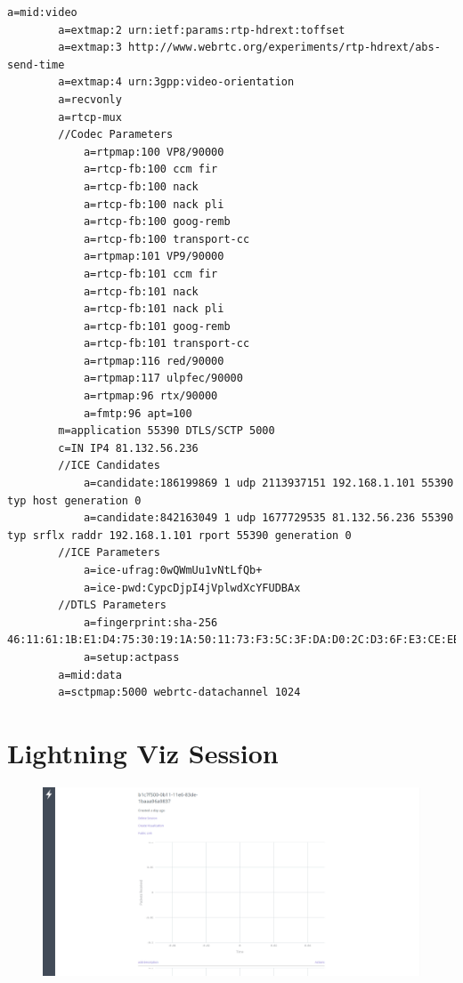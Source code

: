 \documentclass[]{report}
\begin{document}
\begin{lstlisting}[tabsize=1,frame=single, basicstyle=\ttfamily\footnotesize, breaklines=true]
		a=mid:video
		a=extmap:2 urn:ietf:params:rtp-hdrext:toffset
		a=extmap:3 http://www.webrtc.org/experiments/rtp-hdrext/abs-send-time
		a=extmap:4 urn:3gpp:video-orientation
		a=recvonly
		a=rtcp-mux
		//Codec Parameters
			a=rtpmap:100 VP8/90000
			a=rtcp-fb:100 ccm fir
			a=rtcp-fb:100 nack
			a=rtcp-fb:100 nack pli
			a=rtcp-fb:100 goog-remb
			a=rtcp-fb:100 transport-cc
			a=rtpmap:101 VP9/90000
			a=rtcp-fb:101 ccm fir
			a=rtcp-fb:101 nack
			a=rtcp-fb:101 nack pli
			a=rtcp-fb:101 goog-remb
			a=rtcp-fb:101 transport-cc
			a=rtpmap:116 red/90000
			a=rtpmap:117 ulpfec/90000
			a=rtpmap:96 rtx/90000
			a=fmtp:96 apt=100
		m=application 55390 DTLS/SCTP 5000
		c=IN IP4 81.132.56.236
		//ICE Candidates
			a=candidate:186199869 1 udp 2113937151 192.168.1.101 55390 typ host generation 0
			a=candidate:842163049 1 udp 1677729535 81.132.56.236 55390 typ srflx raddr 192.168.1.101 rport 55390 generation 0
		//ICE Parameters
			a=ice-ufrag:0wQWmUu1vNtLfQb+
			a=ice-pwd:CypcDjpI4jVplwdXcYFUDBAx
		//DTLS Parameters
			a=fingerprint:sha-256 46:11:61:1B:E1:D4:75:30:19:1A:50:11:73:F3:5C:3F:DA:D0:2C:D3:6F:E3:CE:EB:1E:13:94:12:00:71:51:60
			a=setup:actpass
		a=mid:data
		a=sctpmap:5000 webrtc-datachannel 1024
	\end{lstlisting}	
	
	\chapter{Lightning Viz Session}
	\begin{figure}[H]
		\centering
		\includegraphics[scale=0.4]{lightning-viz.png}
	\end{figure}
	
\end{document}

